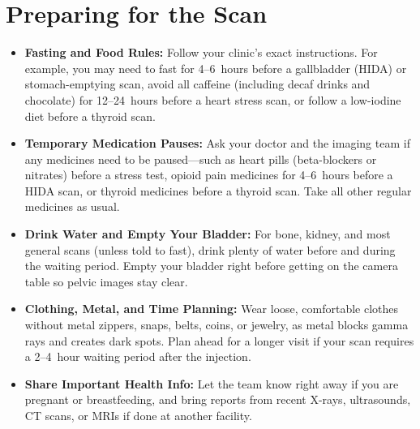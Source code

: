 \section{Preparing for the Scan}
\begin{itemize}
\item \textbf{Fasting and Food Rules:} Follow your clinic's exact instructions. For example, you may need to fast for 4--6~hours before a gallbladder (HIDA) or stomach-emptying scan, avoid all caffeine (including decaf drinks and chocolate) for 12--24~hours before a heart stress scan, or follow a low-iodine diet before a thyroid scan.
\item \textbf{Temporary Medication Pauses:} Ask your doctor and the imaging team if any medicines need to be paused---such as heart pills (beta-blockers or nitrates) before a stress test, opioid pain medicines for 4--6~hours before a HIDA scan, or thyroid medicines before a thyroid scan. Take all other regular medicines as usual.
\item \textbf{Drink Water and Empty Your Bladder:} For bone, kidney, and most general scans (unless told to fast), drink plenty of water before and during the waiting period. Empty your bladder right before getting on the camera table so pelvic images stay clear.
\item \textbf{Clothing, Metal, and Time Planning:} Wear loose, comfortable clothes without metal zippers, snaps, belts, coins, or jewelry, as metal blocks gamma rays and creates dark spots. Plan ahead for a longer visit if your scan requires a 2--4~hour waiting period after the injection.
\item \textbf{Share Important Health Info:} Let the team know right away if you are pregnant or breastfeeding, and bring reports from recent X-rays, ultrasounds, CT scans, or MRIs if done at another facility.
\end{itemize}


